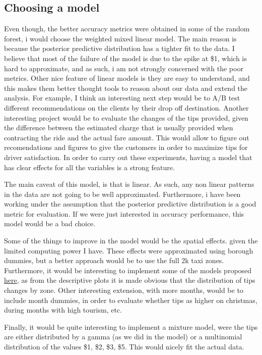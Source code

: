 \documentclass[11pt]{article}
\begin{document}
\subsection{Choosing a model}
\label{sec:org23b73d9}
Even though, the better accuracy metrics were obtained in some of the
random forest, i would choose the weighted mixed linear model.
The main reason is because the posterior predictive distribution
has a tighter fit to the data. I believe that most of the failure of the
model is due to the spike at \$1, which is hard to approximate, and as such,
i am not strongly concerned with the poor metrics.
Other nice feature of linear models is they are easy to understand, and this
makes them better thought tools to reason about our data and extend the analysis.
For example, I think an interesting next step would be to A/B test different
recommendations on the clients by their drop off destination. Another
interesting project would be to evaluate the changes of the tips provided,
given the difference between the estimated charge that is usually provided
when contracting the ride and the actual fare amount.
This would allow to figure out recomendations and figures to give the
customers in order to maximize tips for driver satisfaction. In order to
carry out these experiments, having a model that has clear effects for
all the variables is a strong feature.

The main caveat of this model, is that is linear. As such, any non linear
patterns in the data are not going to be well approximated. Furthermore,
i have been working under the assumption that the posterior predictive
distribution is a good metric for evaluation. If we were just interested
in accuracy performance, this model would be a bad choice.

Some of the things to improve in the model would be the spatial effects.
given the limited computing power I have. These effects were approximated
using borough dummies, but a better approach would be to use the full 2k
taxi zones. Furthermore, it would be interesting to implement some of the
models proposed \href{https://mc-stan.org/users/documentation/case-studies/icar\_stan.html}{here}, as from the descriptive plots it is made obvious that
the distribution of tips changes by zone.
Other interesting extension, with more months, would be to include month
dummies, in order to evaluate whether tips as higher on christmas, during
months with high tourism, etc.

Finally, it would be quite interesting to implement a mixture model,
were the tips are either distributed by a gamma (as we did in the model)
or a multinomial distribution of the values \$1, \$2, \$3, \$5. This would
nicely fit the actual data.
\end{document}
